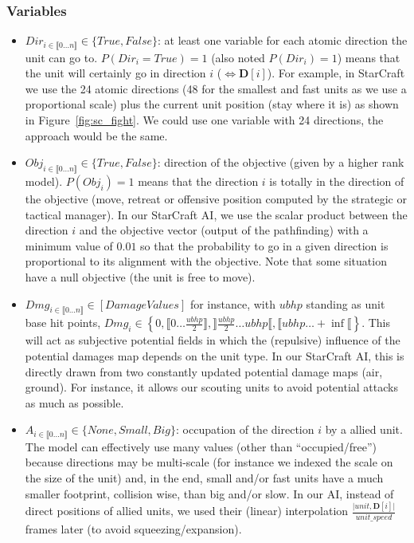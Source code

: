 \subsubsection{Variables}
\begin{itemize}
\item $Dir_{i \in \llbracket 0 \dots n\rrbracket } \in \{True, False\}$: at least one variable for each atomic direction the unit can go to. $P(Dir_i = True) = 1$ (also noted $P(Dir_i) = 1$) means that the unit will certainly go in direction $i$ ($\Leftrightarrow \mathbf{D}[i]$). For example, in StarCraft we use the 24 atomic directions (48 for the smallest and fast units as we use a proportional scale) plus the current unit position (stay where it is) as shown in Figure~\ref{fig:sc_fight}. We could use one variable with 24 directions, the approach would be the same. %
\item $Obj_{i \in \llbracket 0 \dots n\rrbracket } \in \{True, False\}$: direction of the objective (given by a higher rank model). $P(Obj_i) = 1$ means that the direction $i$ is totally in the direction of the objective (move, retreat or offensive position computed by the strategic or tactical manager). In our StarCraft AI, we use the scalar product between the direction $i$ and the objective vector (output of the pathfinding) with a minimum value of $0.01$ so that the probability to go in a given direction is proportional to its alignment with the objective. Note that some situation have a null objective (the unit is free to move).
\item $Dmg_{i \in \llbracket 0 \dots n\rrbracket } \in [Damage Values]$ for instance, with $ubhp$ standing as unit base hit points, $Dmg_i \in \left\{0, \llbracket 0\dots \frac{ubhp}{2}\rrbracket, \rrbracket \frac{ubhp}{2} \dots ubhp\llbracket, \llbracket ubhp \dots +\inf\llbracket \right\}$. This will act as subjective potential fields \citep{Hagelback2009} in which the (repulsive) influence of the potential damages map depends on the unit type. In our StarCraft AI, this is directly drawn from two constantly updated potential damage maps (air, ground). For instance, it allows our scouting units to avoid potential attacks as much as possible.
\item $A_{i \in \llbracket 0 \dots n\rrbracket } \in \{None, Small, Big\}$: occupation of the direction $i$ by a allied unit. The model can effectively use many values (other than ``occupied/free'') because directions may be multi-scale (for instance we indexed the scale on the size of the unit) and, in the end, small and/or fast units have a much smaller footprint, collision wise, than big and/or slow. In our AI, instead of direct positions of allied units, we used their (linear) interpolation $\frac{\mathbf{|}unit, \mathbf{D}[i]\mathbf{|}}{unit\_speed}$ frames later (to avoid squeezing/expansion).

\end{itemize}
